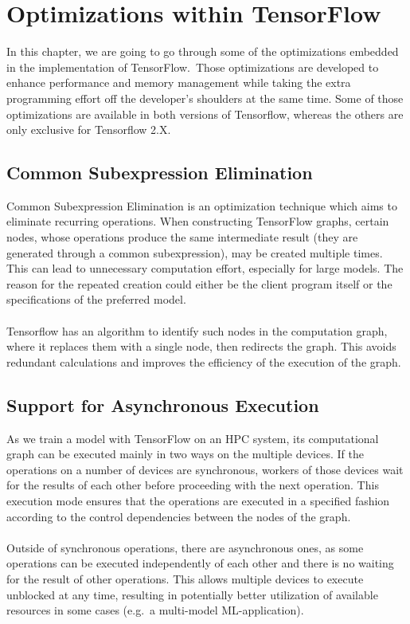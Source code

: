 \documentclass[ieeetran]{article}
\begin{document}
\section{Optimizations within TensorFlow} %
\label{sec:optimizations_tensorflow}
In this chapter, we are going to go through some of the optimizations embedded in the implementation of TensorFlow.\ Those optimizations are developed to enhance performance and memory management while taking the extra programming effort off the developer's shoulders at the same time. Some of those optimizations are available in both versions of Tensorflow, whereas the others are only exclusive for Tensorflow 2.X.

\subsection{Common Subexpression Elimination} %
\label{sub:common_subexpression_elimination}
Common Subexpression Elimination is an optimization technique which aims to eliminate recurring operations. When constructing TensorFlow graphs, certain nodes, whose operations produce the same intermediate result (they are generated through a common subexpression), may be created multiple times. This can lead to unnecessary computation effort, especially for large models. The reason for the repeated creation could either be the client program itself or the specifications of the preferred model.
\\ \\Tensorflow has an algorithm to identify such nodes in the computation graph, where it replaces them with a single node, then redirects the graph. This avoids redundant calculations and improves the efficiency of the execution of the graph.

\subsection{Support for Asynchronous Execution} %
\label{sub:support_for_asynchronous_kernels}
As we train a model with TensorFlow on an HPC system, its computational graph can be executed mainly in two ways on the multiple devices. If the operations on a number of devices are synchronous, workers of those devices wait for the results of each other before proceeding with the next operation. This execution mode ensures that the operations are executed in a specified fashion according to the control dependencies between the nodes of the graph.
\\ \\Outside of synchronous operations, there are asynchronous ones, as some operations can be executed independently of each other and there is no waiting for the result of other operations. This allows multiple devices to execute unblocked at any time, resulting in potentially better utilization of available resources in some cases (e.g.\ a multi-model ML-application).
\end{document}
